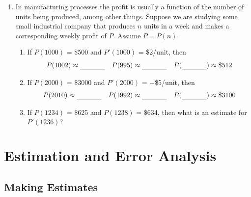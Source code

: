 \begin{enumerate}
\begin{enumerate}
  \item If $h(1.6) = 1$, $h'(1.6) = -5$, a reasonable estimate of
$h(\rule[-3pt]{.3in}{.3pt})$ is 0.

  \item If $F(2) = 0$, $F'(2) = .4$, a reasonable estimate of
$F(\rule[-3pt]{.3in}{.3pt})$ is .15.

  \item If $G(0) = 2$ and $G'(0) =$ \rule[-3pt]{.3in}{.3pt}, a reasonable
estimate of $G(.4)$ is 1.6.

  \item If $H(3) = -3$ and $H'(3) =$ \rule[-3pt]{.3in}{.3pt}, a
reasonable estimate of $H(2.9)$ is $-1$.



\end{enumerate}
\item In manufacturing processes the profit is usually a function of
the number of units being produced, among other things.  Suppose we
are studying some small industrial company that produces $n$ units in
a week and makes a corresponding weekly profit of $P$.  Assume $P =
P(n)$.

  \begin{enumerate}
  \item If $P(1000)$ = \$500 and $P'(1000)$ = \$2/unit, then
	\[
P(1002) \approx \rule[-3pt]{.5in}{.3pt} \quad 
	P(995) \approx \rule[-3pt]{.5in}{.3pt}\quad
	P(\rule[-3pt]{.5in}{.3pt}) \approx \$512
\]


  \item If $P(2000)$ = \$3000 and $P'(2000)$ = $-$\$5/unit, then
	\[
P(2010) \approx \rule[-3pt]{.5in}{.3pt} \quad
	P(1992) \approx \rule[-3pt]{.5in}{.3pt} \quad
	P(\rule[-3pt]{.5in}{.3pt}) \approx \$3100
\]


  \item If $P(1234)$ = \$625 and $P(1238)$ = \$634, then what is an
estimate for $P'(1236)$?




\end{enumerate}
\end{enumerate}
\section{Estimation and Error Analysis}
\label{sec:estimation-and-error-analysis}

\subsection{Making Estimates}
\label{subsec:making-estimates}

